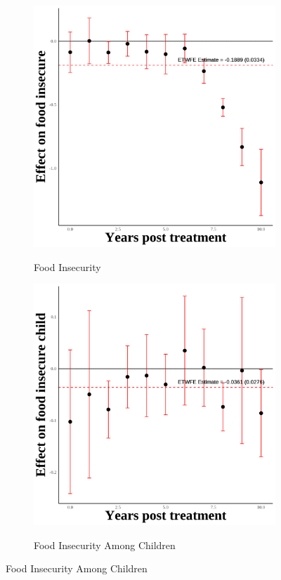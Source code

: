 \documentclass[12pt,english]{article}
\begin{document}
\begin{figure}[H]
  \begin{subfigure}[b]{0.3\textwidth}
    \centering
    \caption{Food Insecurity}
    \includegraphics[width=\linewidth]{figures/plot63-food_insecure_event_study-third-one.png}
    \label{fig:food-insecure-third-one}
  \end{subfigure}
  \hfill
  \begin{subfigure}[b]{0.3\textwidth}
    \centering
    \caption{Food Insecurity Among Children}
    \includegraphics[width=\linewidth]{figures/plot64-food_insecure_child_event_study-third-one.png}
    \label{fig:food-insecure-child-third-one}
  \end{subfigure}

\end{figure}
\end{document}
